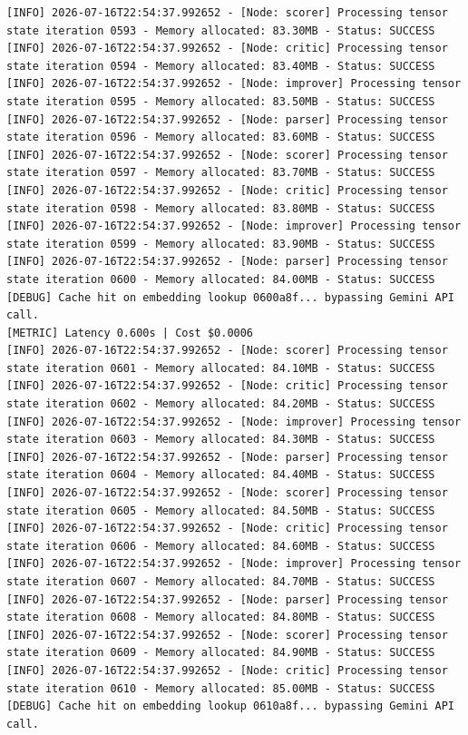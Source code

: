 \documentclass[10pt,journal,compsoc]{IEEEtran}
\begin{document}
\begin{verbatim}
[INFO] 2026-07-16T22:54:37.992652 - [Node: scorer] Processing tensor state iteration 0593 - Memory allocated: 83.30MB - Status: SUCCESS
[INFO] 2026-07-16T22:54:37.992652 - [Node: critic] Processing tensor state iteration 0594 - Memory allocated: 83.40MB - Status: SUCCESS
[INFO] 2026-07-16T22:54:37.992652 - [Node: improver] Processing tensor state iteration 0595 - Memory allocated: 83.50MB - Status: SUCCESS
[INFO] 2026-07-16T22:54:37.992652 - [Node: parser] Processing tensor state iteration 0596 - Memory allocated: 83.60MB - Status: SUCCESS
[INFO] 2026-07-16T22:54:37.992652 - [Node: scorer] Processing tensor state iteration 0597 - Memory allocated: 83.70MB - Status: SUCCESS
[INFO] 2026-07-16T22:54:37.992652 - [Node: critic] Processing tensor state iteration 0598 - Memory allocated: 83.80MB - Status: SUCCESS
[INFO] 2026-07-16T22:54:37.992652 - [Node: improver] Processing tensor state iteration 0599 - Memory allocated: 83.90MB - Status: SUCCESS
[INFO] 2026-07-16T22:54:37.992652 - [Node: parser] Processing tensor state iteration 0600 - Memory allocated: 84.00MB - Status: SUCCESS
[DEBUG] Cache hit on embedding lookup 0600a8f... bypassing Gemini API call.
[METRIC] Latency 0.600s | Cost $0.0006
[INFO] 2026-07-16T22:54:37.992652 - [Node: scorer] Processing tensor state iteration 0601 - Memory allocated: 84.10MB - Status: SUCCESS
[INFO] 2026-07-16T22:54:37.992652 - [Node: critic] Processing tensor state iteration 0602 - Memory allocated: 84.20MB - Status: SUCCESS
[INFO] 2026-07-16T22:54:37.992652 - [Node: improver] Processing tensor state iteration 0603 - Memory allocated: 84.30MB - Status: SUCCESS
[INFO] 2026-07-16T22:54:37.992652 - [Node: parser] Processing tensor state iteration 0604 - Memory allocated: 84.40MB - Status: SUCCESS
[INFO] 2026-07-16T22:54:37.992652 - [Node: scorer] Processing tensor state iteration 0605 - Memory allocated: 84.50MB - Status: SUCCESS
[INFO] 2026-07-16T22:54:37.992652 - [Node: critic] Processing tensor state iteration 0606 - Memory allocated: 84.60MB - Status: SUCCESS
[INFO] 2026-07-16T22:54:37.992652 - [Node: improver] Processing tensor state iteration 0607 - Memory allocated: 84.70MB - Status: SUCCESS
[INFO] 2026-07-16T22:54:37.992652 - [Node: parser] Processing tensor state iteration 0608 - Memory allocated: 84.80MB - Status: SUCCESS
[INFO] 2026-07-16T22:54:37.992652 - [Node: scorer] Processing tensor state iteration 0609 - Memory allocated: 84.90MB - Status: SUCCESS
[INFO] 2026-07-16T22:54:37.992652 - [Node: critic] Processing tensor state iteration 0610 - Memory allocated: 85.00MB - Status: SUCCESS
[DEBUG] Cache hit on embedding lookup 0610a8f... bypassing Gemini API call.

\end{verbatim}
\end{document}
